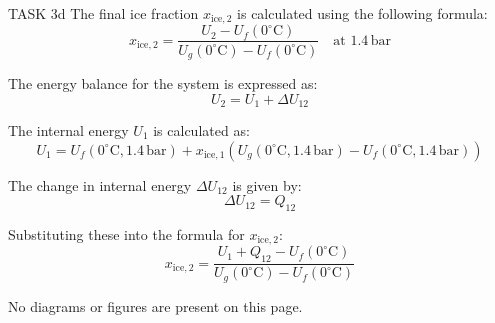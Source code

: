 TASK 3d  
The final ice fraction \( x_{\text{ice},2} \) is calculated using the following formula:  
\[
x_{\text{ice},2} = \frac{U_2 - U_f(0^\circ\text{C})}{U_g(0^\circ\text{C}) - U_f(0^\circ\text{C})} \quad \text{at } 1.4 \, \text{bar}
\]

The energy balance for the system is expressed as:  
\[
U_2 = U_1 + \Delta U_{12}
\]

The internal energy \( U_1 \) is calculated as:  
\[
U_1 = U_f(0^\circ\text{C}, 1.4 \, \text{bar}) + x_{\text{ice},1} \left( U_g(0^\circ\text{C}, 1.4 \, \text{bar}) - U_f(0^\circ\text{C}, 1.4 \, \text{bar}) \right)
\]

The change in internal energy \( \Delta U_{12} \) is given by:  
\[
\Delta U_{12} = Q_{12}
\]

Substituting these into the formula for \( x_{\text{ice},2} \):  
\[
x_{\text{ice},2} = \frac{U_1 + Q_{12} - U_f(0^\circ\text{C})}{U_g(0^\circ\text{C}) - U_f(0^\circ\text{C})}
\]  

No diagrams or figures are present on this page.